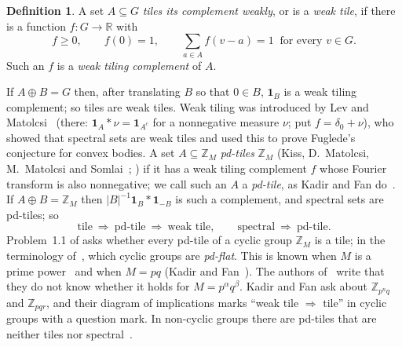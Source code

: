 \documentclass[11pt,a4paper]{amsart}
\theoremstyle{definition}
\newtheorem{definition}[theorem]{Definition}
\theoremstyle{remark}
\newcommand{\Z}{\mathbb{Z}}
\newcommand{\R}{\mathbb{R}}
\newcommand{\one}{\mathbf{1}}
\begin{document}
\begin{definition}
A set $A\subseteq G$ \emph{tiles its complement weakly}, or is a \emph{weak tile}, if there is a function
$f\colon G\to\R$ with
\[
 f\ge 0,\qquad f(0)=1,\qquad \sum_{a\in A} f(v-a)=1\ \text{ for every } v\in G .
\]
Such an $f$ is a \emph{weak tiling complement} of $A$.
\end{definition}

If $A\oplus B=G$ then, after translating $B$ so that $0\in B$, $\one_B$ is a weak tiling complement; so tiles are
weak tiles. Weak tiling was introduced by Lev and Matolcsi~\cite{LM} (there: $\one_A*\nu=\one_{A^c}$ for a
nonnegative measure $\nu$; put $f=\delta_0+\nu$), who showed that spectral sets are weak tiles and used this to
prove Fuglede's conjecture for convex bodies. A set $A\subseteq\Z_M$ \emph{pd-tiles} $\Z_M$ (Kiss, D.~Matolcsi,
M.~Matolcsi and Somlai~\cite[Definition~1.1]{KMMS}; \cite[Definition~1.3]{KLMS}) if it has a weak tiling complement $f$ whose Fourier
transform is also nonnegative; we call such an $A$ a \emph{pd-tile}, as Kadir and Fan do~\cite[Definition~1.2]{KF}. If $A\oplus B=\Z_M$ then $|B|^{-1}\one_B*\one_{-B}$ is such a complement, and
spectral sets are pd-tiles; so
\[
 \text{tile}\ \Longrightarrow\ \text{pd-tile}\ \Longrightarrow\ \text{weak tile},\qquad
 \text{spectral}\ \Longrightarrow\ \text{pd-tile}.
\]
Problem~1.1 of \cite{KLMS} asks whether every pd-tile of a cyclic group $\Z_M$ is a tile; in the terminology
of~\cite{KMMS}, which cyclic groups are \emph{pd-flat}. This is known when $M$ is a prime power~\cite{KLMS} and
when $M=pq$ (Kadir and Fan~\cite{KF}). The authors of~\cite{KLMS} write that they do not know whether it holds
for $M=p^\alpha q^\beta$. Kadir and Fan ask about $\Z_{p^nq}$ and $\Z_{pqr}$, and their diagram of implications
marks ``weak tile $\Rightarrow$ tile'' in cyclic groups with a question mark. In non-cyclic groups there are
pd-tiles that are neither tiles nor spectral~\cite{KLMS2}.
\end{document}
